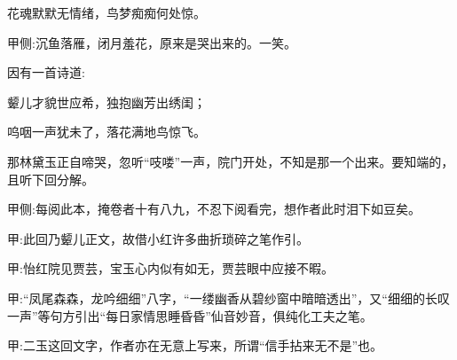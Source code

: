\begin{poem}
    \begin{pl}花魂默默无情绪，鸟梦痴痴何处惊。\end{pl}\begin{note}甲侧:沉鱼落雁，闭月羞花，原来是哭出来的。一笑。\end{note}
\end{poem}


\begin{parag}
    因有一首诗道:
\end{parag}


\begin{poem}
    \begin{pl}颦儿才貌世应希，独抱幽芳出绣闺；\end{pl}

    \begin{pl}呜咽一声犹未了，落花满地鸟惊飞。\end{pl}
\end{poem}


\begin{parag}
    那林黛玉正自啼哭，忽听“吱喽”一声，院门开处，不知是那一个出来。要知端的，且听下回分解。\begin{note}甲侧:每阅此本，掩卷者十有八九，不忍下阅看完，想作者此时泪下如豆矣。\end{note}
\end{parag}


\begin{parag}
    \begin{note}甲:此回乃颦儿正文，故借小红许多曲折琐碎之笔作引。\end{note}
\end{parag}


\begin{parag}
    \begin{note}甲:怡红院见贾芸，宝玉心内似有如无，贾芸眼中应接不暇。\end{note}
\end{parag}


\begin{parag}
    \begin{note}甲:“凤尾森森，龙吟细细”八字，“一缕幽香从碧纱窗中暗暗透出”，又“细细的长叹一声”等句方引出“每日家情思睡昏昏”仙音妙音，俱纯化工夫之笔。\end{note}
\end{parag}


\begin{parag}
    \begin{note}甲:二玉这回文字，作者亦在无意上写来，所谓“信手拈来无不是”也。\end{note}
\end{parag}


